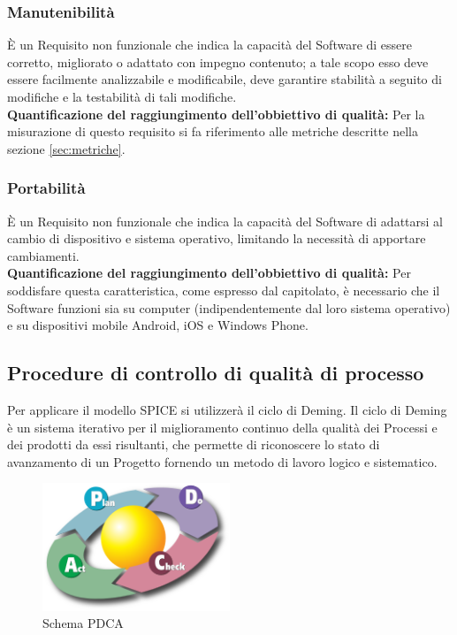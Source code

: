 \subsubsection{Manutenibilità}
È un Requisito non funzionale che indica la capacità del Software di essere corretto, migliorato o adattato con impegno contenuto; a tale scopo esso deve essere facilmente analizzabile e modificabile, deve garantire stabilità a seguito di modifiche e la testabilità di tali modifiche.  \\
\textbf{Quantificazione del raggiungimento dell’obbiettivo di qualità:} Per la misurazione di questo requisito si fa riferimento alle metriche descritte nella sezione \ref{sec:metriche}.

\subsubsection{Portabilità}
È un Requisito non funzionale che indica la capacità del Software di adattarsi al cambio di dispositivo e sistema operativo, limitando la necessità di apportare cambiamenti.\\
\textbf{Quantificazione del raggiungimento dell’obbiettivo di qualità:} Per soddisfare questa caratteristica, come espresso dal capitolato, è necessario che il Software funzioni sia su computer (indipendentemente dal loro sistema operativo) e su dispositivi mobile Android, iOS e Windows Phone.

\subsection{Procedure di controllo di qualità di processo}
Per applicare il modello SPICE si utilizzerà il ciclo di Deming. Il ciclo di Deming è un sistema iterativo per il miglioramento continuo della qualità dei Processi e dei prodotti da essi risultanti, che permette di riconoscere lo stato di avanzamento di un Progetto fornendo un metodo di lavoro logico e sistematico.

\begin{figure}[h]
  \centering
    \includegraphics[width=0.5\textwidth]{./images/deming}
  \caption{Schema PDCA}
  \label{fig:deming}
\end{figure}

